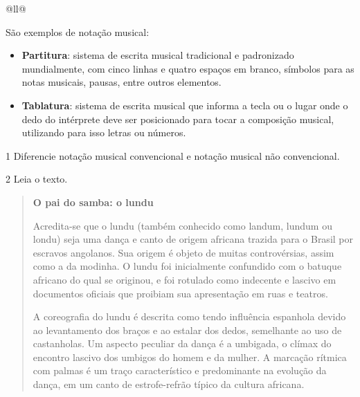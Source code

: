 \begin{itemize}
\begin{itemize}
\begin{escolha}[]{@{}ll@{}}
{São exemplos de notação musical:

\begin{itemize}
\item
  \textbf{Partitura}: sistema de escrita musical tradicional e padronizado
  mundialmente, com cinco linhas e quatro espaços em branco, símbolos
  para as notas musicais, pausas, entre outros elementos.
\item
  \textbf{Tablatura}: sistema de escrita musical que informa a tecla ou o lugar
  onde o dedo do intérprete deve ser posicionado para tocar a composição
  musical, utilizando para isso letras ou números.
\end{itemize}
}


\num{1} Diferencie notação musical convencional e notação musical não convencional.


\num{2} Leia o texto.

\begin{quote}
\textbf{O pai do samba: o lundu}

Acredita-se que o lundu (também conhecido como landum, lundum ou londu) seja uma dança e 
canto de origem africana trazida para o Brasil por escravos angolanos. Sua origem é 
objeto de muitas controvérsias, assim como a da modinha. O lundu foi inicialmente 
confundido com o batuque africano do qual se originou, e foi rotulado como indecente e 
lascivo em documentos oficiais que proibiam sua apresentação em ruas e teatros.

A coreografia do lundu é descrita como tendo influência espanhola devido ao levantamento 
dos braços e ao estalar dos dedos, semelhante ao uso de castanholas. Um aspecto peculiar 
da dança é a umbigada, o clímax do encontro lascivo dos umbigos do homem e da mulher. A 
marcação rítmica com palmas é um traço característico e predominante na evolução da 
dança, em um canto de estrofe-refrão típico da cultura africana.


\end{quote}
\end{escolha}
\end{itemize}
\end{itemize}
